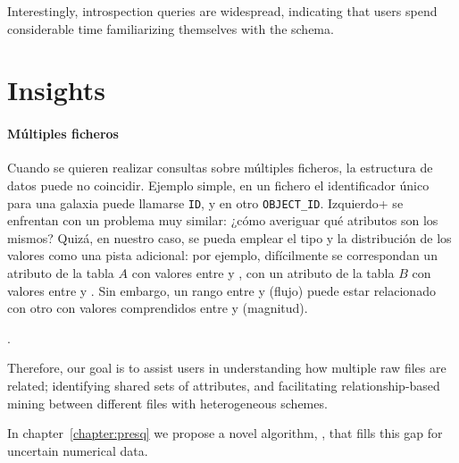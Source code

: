 Interestingly, introspection queries are widespread, indicating that users spend considerable
time familiarizing themselves with the schema.


\section{Insights}

\paragraph{Múltiples ficheros} Cuando se quieren realizar consultas sobre múltiples
ficheros, la estructura de datos puede no coincidir. Ejemplo simple, en un fichero el
identificador único para una galaxia puede llamarse \texttt{ID}, y en otro \texttt{OBJECT\_ID}.
Izquierdo+\cite{Izquierdo2013} se enfrentan con un problema muy similar: ¿cómo averiguar
qué atributos son los mismos? Quizá, en nuestro caso, se pueda emplear el tipo y la distribución de los valores
como una pista adicional: por ejemplo, difícilmente se correspondan un atributo de la tabla $A$ con
valores entre  y , con un atributo de la tabla $B$ con valores entre 
y . Sin embargo, un rango entre  y  (flujo) puede estar
relacionado con otro con valores comprendidos entre  y  (magnitud).

.





Therefore, our goal is to assist users in understanding how multiple raw files are related;
identifying shared sets of attributes, and facilitating
relationship-based mining between different files with heterogeneous schemes.

In chapter~\ref{chapter:presq} we propose a novel algorithm, \PresQ, that fills this gap for
uncertain numerical data.